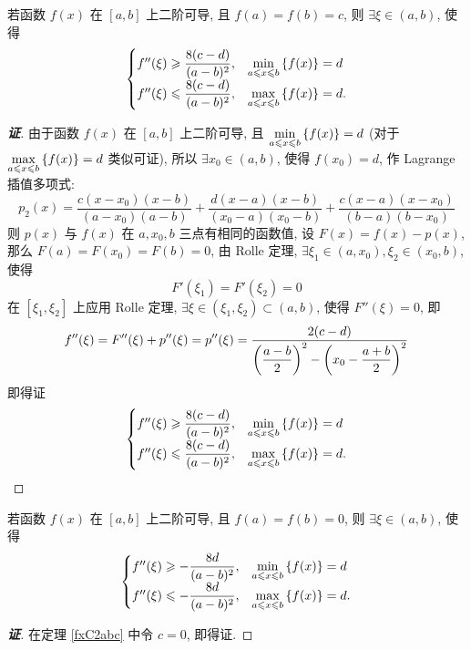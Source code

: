 \begin{theorem}
    若函数 $f(x)\text{ 在 }[a,b]$ 上二阶可导, 且 $f(a)=f(b)=c$, 则 $\exists\xi\in(a,b)$, \label{fxC2abc}使得 $$\begin{cases}
            f''(\xi)\geqslant \dfrac{8(c-d)}{(a-b)^2}, & \min\limits_{a\leqslant x\leqslant b}\qty{f(x)}=d  \\
            f''(\xi)\leqslant \dfrac{8(c-d)}{(a-b)^2}, & \max\limits_{a\leqslant x\leqslant b}\qty{f(x)}=d.
        \end{cases}$$
\end{theorem}
\begin{proof}[{\songti \textbf{证}}]
    由于函数 $f(x)\text{ 在 }[a,b]$ 上二阶可导, 且 $\min\limits_{a\leqslant x\leqslant b}\qty{f(x)}=d$ (对于 $\max\limits_{a\leqslant x\leqslant b}\qty{f(x)}=d$ 类似可证), 所以 $\exists x_0\in(a,b)$, 使得 $f(x_0)=d$, 作 Lagrange 插值多项式:
    $$p_2(x)=\dfrac{c(x-x_0)(x-b)}{(a-x_0)(a-b)}+\dfrac{d(x-a)(x-b)}{(x_0-a)(x_0-b)}+\dfrac{c(x-a)(x-x_0)}{(b-a)(b-x_0)}$$
    则 $p(x)$ 与 $f(x)$ 在 $a,x_0,b$ 三点有相同的函数值, 设 $F(x)=f(x)-p(x)$, 那么 $F(a)=F(x_0)=F(b)=0$, 由 Rolle 定理, $\exists\xi_1\in(a,x_0),\xi_2\in(x_0,b)$, 使得 $$F'(\xi_1)=F'(\xi_2)=0$$
    在 $[\xi_1,\xi_2]$ 上应用 Rolle 定理, $\exists\xi\in(\xi_1,\xi_2)\subset(a,b)$, 使得 $F''(\xi)=0$, 即 $$f''(\xi)=F''(\xi)+p''(\xi)=p''(\xi)=\dfrac{2(c-d)}{\qty(\dfrac{a-b}{2})^2-\qty(x_0-\dfrac{a+b}{2})^2}$$
    即得证 $$\begin{cases}
            f''(\xi)\geqslant \dfrac{8(c-d)}{(a-b)^2}, & \min\limits_{a\leqslant x\leqslant b}\qty{f(x)}=d  \\
            f''(\xi)\leqslant \dfrac{8(c-d)}{(a-b)^2}, & \max\limits_{a\leqslant x\leqslant b}\qty{f(x)}=d.
        \end{cases}$$
\end{proof}
\begin{inference}
    若函数 $f(x)\text{ 在 }[a,b]$ 上二阶可导, 且 $f(a)=f(b)=0$, 则 $\exists\xi\in(a,b)$, 使得 $$\begin{cases}
            f''(\xi)\geqslant -\dfrac{8d}{(a-b)^2}, & \min\limits_{a\leqslant x\leqslant b}\qty{f(x)}=d  \\
            f''(\xi)\leqslant -\dfrac{8d}{(a-b)^2}, & \max\limits_{a\leqslant x\leqslant b}\qty{f(x)}=d.
        \end{cases}$$
\end{inference}
\begin{proof}[{\songti \textbf{证}}]
    在定理 \ref{fxC2abc} 中令 $c=0$, 即得证.
\end{proof}


